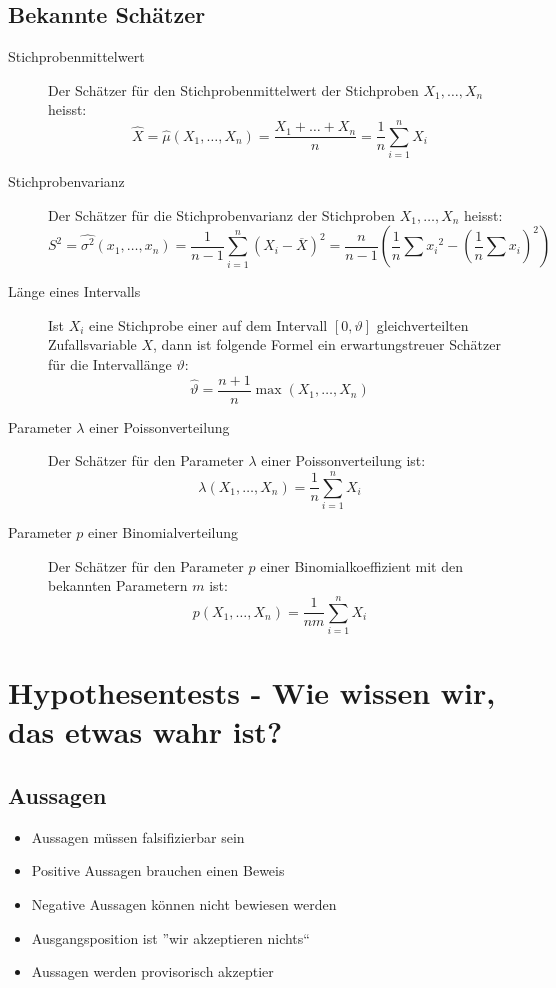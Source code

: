\subsection{Bekannte Schätzer}
\begin{description}
  \item[Stichprobenmittelwert] Der Schätzer für den
    Stichprobenmittelwert der Stichproben $X_1, \dots, X_n$ heisst:
    \[ \hat{X} = \hat{\mu}(X_1, \dots, X_n) = \frac{X_1 + \ldots +
    X_n}{n} = \frac{1}{n} \sum_{i=1}^{n} X_i \]
  \item[Stichprobenvarianz] Der Schätzer für die Stichprobenvarianz der
    Stichproben $X_1, \dots, X_n$ heisst:
    \[ S^2 = \hat{\sigma^2}(x_1, \dots, x_n) = \frac{1}{n-1}
    \sum_{i=1}^{n}(X_i - \overline{X})^2 = \frac{n}{n-1}\left( \frac{1}{n}
    \sum {x_i}^2 - \left(\frac{1}{n} \sum x_i\right)^2\right)\]
  \item[Länge eines Intervalls] Ist $X_i$ eine Stichprobe einer auf dem
    Intervall $[0, \vartheta]$ gleichverteilten Zufallsvariable $X$, dann ist
    folgende Formel ein erwartungstreuer Schätzer für die Intervallänge
    $\vartheta$:
    \[ \hat{\vartheta} = \frac{n+1}{n} \operatorname{max}(X_1, \dots, X_n)\]
  \item[Parameter $\lambda$ einer Poissonverteilung] Der Schätzer für
    den Parameter $\lambda$ einer Poissonverteilung ist:
    \[ \lambda(X_1, \dots, X_n) = \frac{1}{n} \sum_{i=1}^{n} X_i \]
  \item[Parameter $p$ einer Binomialverteilung] Der Schätzer für den
    Parameter $p$ einer Binomialkoeffizient mit den bekannten Parametern
    $m$ ist:
    \[ p(X_1, \dots, X_n) = \frac{1}{nm} \sum_{i=1}^{n} X_i \]
\end{description}

\section{Hypothesentests - Wie wissen wir, das etwas wahr ist?}
\subsection{Aussagen}
\begin{itemize}
  \item Aussagen müssen falsifizierbar sein
  \item Positive Aussagen brauchen einen Beweis
  \item Negative Aussagen können nicht bewiesen werden
  \item Ausgangsposition ist ''wir akzeptieren nichts``
  \item Aussagen werden provisorisch akzeptier
\end{itemize}


